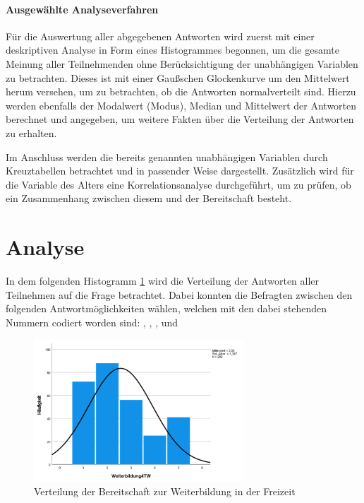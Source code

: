 \paragraph*{Ausgewählte Analyseverfahren}

Für die Auswertung aller abgegebenen Antworten wird zuerst mit einer deskriptiven Analyse in Form eines Histogrammes
begonnen, um die gesamte Meinung aller Teilnehmenden ohne Berücksichtigung der unabhängigen Variablen zu betrachten. 
Dieses ist mit einer Gaußschen Glockenkurve um den Mittelwert herum versehen, um zu betrachten, ob die Antworten 
normalverteilt sind. %
Hierzu werden ebenfalls der Modalwert (Modus), Median und Mittelwert der Antworten berechnet und angegeben,
um weitere Fakten über die Verteilung der Antworten zu erhalten. %

Im Anschluss werden die bereits genannten unabhängigen Variablen durch Kreuztabellen betrachtet und
in passender Weise dargestellt.
Zusätzlich wird für die Variable des Alters eine Korrelationsanalyse durchgeführt, um zu prüfen, ob 
ein Zusammenhang zwischen diesem und der Bereitschaft besteht.



\section{Analyse}

In dem folgenden Histogramm \ref{fig:bereitschaft_weiterbildung_verteilung} wird die Verteilung 
der Antworten aller Teilnehmen auf die Frage  betrachtet. Dabei konnten die Befragten zwischen den folgenden
Antwortmöglichkeiten wählen, welchen mit den dabei stehenden Nummern codiert worden sind:
 , , ,  und 

\begin{figure}[h]
    \centering
    \includegraphics[width=0.7\textwidth]{04_Artefakte/01_Abbildungen/hypothese_9/histogramm_weiterbildung.png}
    \caption{Verteilung der Bereitschaft zur Weiterbildung in der Freizeit}
    \label{fig:bereitschaft_weiterbildung_verteilung}
\end{figure}

